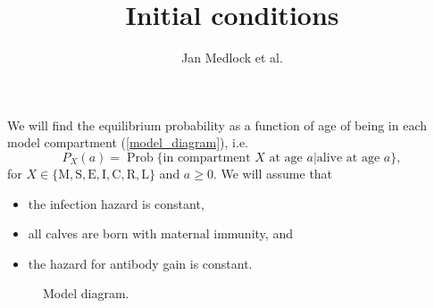 \documentclass[12pt]{article}
\title{Initial conditions}
\author{Jan Medlock et al.}
\DeclareMathOperator{\Prob}{Prob}
\begin{document}
\maketitle

We will find the equilibrium probability as a function of age of being
in each model compartment (\autoref{model_diagram}), i.e.
\begin{equation}
  P_X(a) = \Prob\{\text{in compartment $X$ at age $a$}|\text{alive at
    age $a$}\},
\end{equation}
for $X \in \{\mathrm{M}, \mathrm{S}, \mathrm{E}, \mathrm{I},
\mathrm{C}, \mathrm{R}, \mathrm{L}\}$
and $a \geq 0$.
We will assume that
\begin{itemize}
\item the infection hazard is constant,
\item all calves are born with maternal immunity, and
\item the hazard for antibody gain is constant.
\end{itemize}

\begin{figure}
  \begin{center}
    
  \end{center}
  \caption{Model diagram.}
  \label{model_diagram}
\end{figure}

\clearpage
\end{document}
